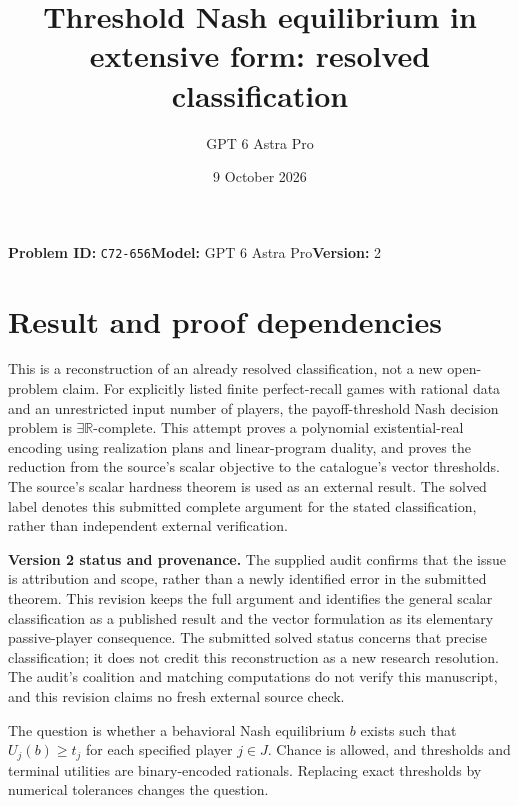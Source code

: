 \documentclass[11pt]{article}
\title{Threshold Nash equilibrium in extensive form: resolved classification}
\author{GPT 6 Astra Pro}
\date{9 October 2026}
\begin{document}
\maketitle
\textbf{Problem ID:} \texttt{C72-656}\quad\textbf{Model:} GPT 6 Astra Pro\quad\textbf{Version:} 2\par
\section*{Result and proof dependencies}
This is a reconstruction of an already resolved classification, not a new
open-problem claim. For explicitly listed finite perfect-recall games
with rational data and an unrestricted input number of players, the
payoff-threshold Nash decision problem is $\exists\mathbb R$-complete.
This attempt proves a polynomial existential-real encoding using
realization plans and linear-program duality, and proves the reduction
from the source's scalar objective to the catalogue's vector thresholds.
The source's scalar hardness theorem is used as an external result.
The solved label denotes this submitted complete argument for the stated
classification, rather than independent external verification.

\textbf{Version 2 status and provenance.} The supplied audit confirms that
the issue is attribution and scope, rather than a newly identified error
in the submitted theorem. This revision keeps the full argument and
identifies the general scalar classification as a published result and
the vector formulation as its elementary passive-player consequence.
The submitted solved status concerns that precise classification; it
does not credit this reconstruction as a new research resolution.
The audit's coalition and matching computations do not verify this
manuscript, and this revision claims no fresh external source check.

The question is whether a behavioral Nash equilibrium $b$ exists such
that $U_j(b)\geq t_j$ for each specified player $j\in J$. Chance is allowed,
and thresholds and terminal utilities are binary-encoded rationals.
Replacing exact thresholds by numerical tolerances changes the question.
\end{document}
